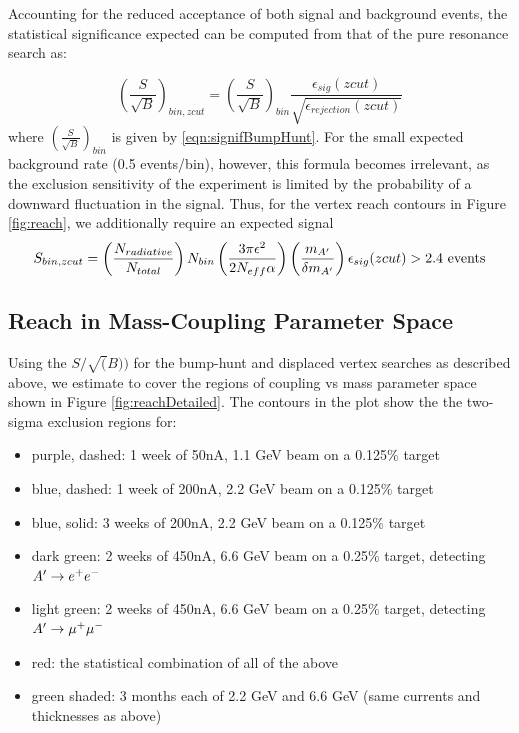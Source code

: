 Accounting for the reduced acceptance of both signal and background events, the statistical 
significance expected  can be computed from that of the pure resonance 
search as:  

\begin{equation}
 \left({\frac{S} {\sqrt{B}}}\right)_{bin,zcut}=\left ({\frac{S} {\sqrt{B}}}\right)_{bin}  
{\frac{\epsilon_{sig} (zcut)} {\sqrt{\epsilon_{rejection} (zcut)}}}
\label{eqn:signifVertex}
\end{equation}
where $\left({\frac{S} {\sqrt{B}}}\right)_{bin}$ is given by \eqref{eqn:signifBumpHunt}. For the small expected background rate 
(0.5 events/bin), however, this formula becomes irrelevant, as the exclusion sensitivity of 
the experiment is limited by the probability of a downward fluctuation in the signal.  
Thus, for the vertex reach contours in Figure \ref{fig:reach}, we additionally require 
an expected signal
\begin{equation}
 S_{bin,zcut}=\left({{\frac{N_{radiative}} {N_{total}}}}\right) N_{bin} 
\left({\frac{3\pi \epsilon^2} {2 N_{eff}\alpha}}\right) \left({\frac{m_{A'}} {\delta m_{A'}}}\right) \epsilon_{sig}
 (zcut) > 2.4~ {\rm events} 
 \label{eqn:signalVertex}
\end{equation}

\subsection{Reach in Mass-Coupling Parameter Space}

Using the $S/\sqrt(B))$ for the bump-hunt  and displaced vertex searches as described above, we estimate to cover the regions of coupling vs mass parameter space shown in Figure \ref{fig:reachDetailed}.  The contours in the plot show the the two-sigma exclusion regions for:
\begin{itemize}
\item purple, dashed: 1 week of 50nA, 1.1 GeV beam on a 0.125\% target
\item blue, dashed: 1 week of 200nA, 2.2 GeV beam on a 0.125\% target
\item blue, solid: 3 weeks of 200nA, 2.2 GeV beam on a 0.125\% target
\item dark green: 2 weeks of 450nA, 6.6 GeV beam on a 0.25\% target, detecting $A^\prime\rightarrow e^+e^-$
\item light green: 2 weeks of 450nA, 6.6 GeV beam on a 0.25\% target, detecting $A^\prime\rightarrow \mu^+\mu^-$
\item red:  the statistical combination of all of the above
\item green shaded:  3 months each of 2.2 GeV and 6.6 GeV (same currents and thicknesses as above)
\end{itemize}



